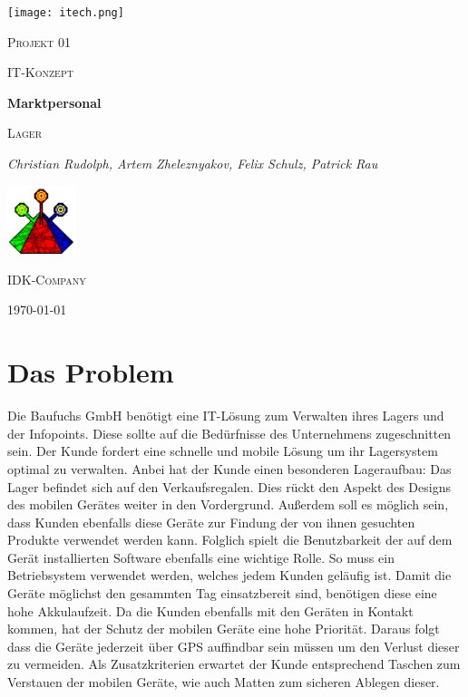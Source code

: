 \documentclass{article}
\begin{document}
\begin{titlepage}
	\centering
	\texttt{[image: itech.png]}\par\vspace{1cm}
	{\scshape\LARGE Projekt 01 \par}
	\vspace{1cm}
	{\scshape\small IT-Konzept\par}
	\vspace{1.5cm}
	{\huge\bfseries Marktpersonal \par}
    \vspace{0.5cm}
    {\scshape\small Lager \par}
	
	\vspace{2cm}
	{\Large\itshape Christian Rudolph, Artem Zheleznyakov, Felix Schulz, Patrick Rau\par}
    \vspace{5cm}
    \includegraphics[width=0.15\textwidth]{idk-tower.png}\par\vspace{0.15cm}
    \textsc{IDK-Company}
	\vfill
	{\large \today\par}
\end{titlepage}
\tableofcontents
\newpage
\section{Das Problem}
Die Baufuchs GmbH benötigt eine IT-Lösung zum Verwalten ihres Lagers und der Infopoints. Diese sollte auf die Bedürfnisse des Unternehmens zugeschnitten sein.\newline
Der Kunde fordert eine schnelle und mobile Lösung um ihr Lagersystem optimal zu verwalten. Anbei hat der Kunde einen besonderen Lageraufbau: \newline Das Lager befindet sich auf den Verkaufsregalen. Dies rückt den Aspekt des Designs des mobilen Gerätes weiter in den Vordergrund. Außerdem soll es möglich sein, dass Kunden ebenfalls diese Geräte zur Findung der von ihnen gesuchten Produkte verwendet werden kann. Folglich spielt die Benutzbarkeit der auf dem Gerät installierten Software ebenfalls eine wichtige Rolle. So muss ein Betriebsystem verwendet werden, welches jedem Kunden geläufig ist. Damit die Geräte möglichst den gesammten Tag einsatzbereit sind, benötigen diese eine hohe Akkulaufzeit. Da die Kunden ebenfalls mit den Geräten in Kontakt kommen, hat der Schutz der mobilen Geräte eine hohe Priorität. Daraus folgt dass die Geräte jederzeit über GPS auffindbar sein müssen um den Verlust dieser zu vermeiden. Als Zusatzkriterien erwartet der Kunde entsprechend Taschen zum Verstauen der mobilen Geräte, wie auch Matten zum sicheren Ablegen dieser.
\end{document}
